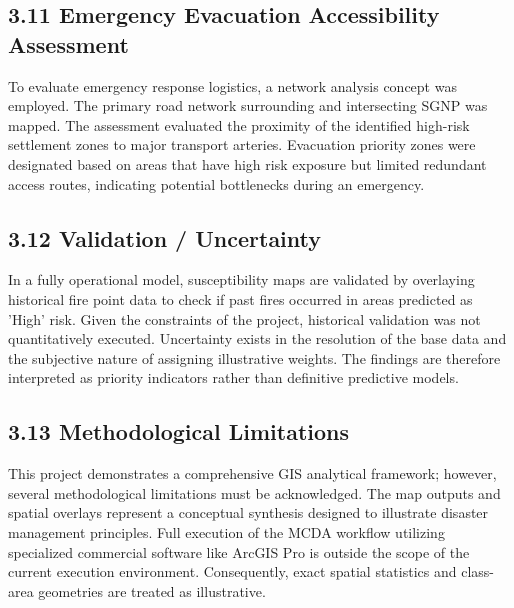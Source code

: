 \documentclass[12pt,a4paper]{article}
\begin{document}
\subsection*{3.11 Emergency Evacuation Accessibility Assessment}

To evaluate emergency response logistics, a network analysis concept was employed. The primary road network surrounding and intersecting SGNP was mapped. The assessment evaluated the proximity of the identified high-risk settlement zones to major transport arteries. Evacuation priority zones were designated based on areas that have high risk exposure but limited redundant access routes, indicating potential bottlenecks during an emergency.



\subsection*{3.12 Validation / Uncertainty}

In a fully operational model, susceptibility maps are validated by overlaying historical fire point data to check if past fires occurred in areas predicted as 'High' risk. Given the constraints of the project, historical validation was not quantitatively executed. Uncertainty exists in the resolution of the base data and the subjective nature of assigning illustrative weights. The findings are therefore interpreted as priority indicators rather than definitive predictive models.



\subsection*{3.13 Methodological Limitations}

This project demonstrates a comprehensive GIS analytical framework; however, several methodological limitations must be acknowledged. The map outputs and spatial overlays represent a conceptual synthesis designed to illustrate disaster management principles. Full execution of the MCDA workflow utilizing specialized commercial software like ArcGIS Pro is outside the scope of the current execution environment. Consequently, exact spatial statistics and class-area geometries are treated as illustrative.
\end{document}
